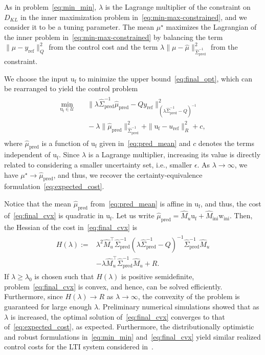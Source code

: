 \documentclass[letterpaper, 10 pt, conference]{ieeeconf}
\def\wir{\mathrm{w}_\mathrm{ini}}
\def\ufr{\mathrm{u}_\mathrm{f}}
\def\ur{u_\mathrm{ref}}
\def\yr{y_\mathrm{ref}}
\def\mph{\hat{\mu}_\mathrm{pred}}
\def\Sph{\hat{\Sigma}_\mathrm{pred}}
\begin{document}
As in problem~\eqref{eq:min_min}, $\lambda$ is the Lagrange multiplier of the constraint on $D_{KL}$ in the inner maximization problem in~\eqref{eq:min-max-constrained}, and we consider it to be a tuning parameter.
The mean $\mu^\star$ maximizes the Lagrangian of the inner problem in~\eqref{eq:min-max-constrained} by balancing the term $\|\mu-\yr\|_Q^2$ from the control cost and the term $\lambda\|\mu-\hat{\mu}\|_{\Sph^{-1}}^2$ from the constraint.

We choose the input $\ufr$ to minimize the upper bound~\eqref{eq:final_opt}, which can be rearranged to yield the control problem
\begin{align} \label{eq:final_cvx}
\begin{split}
    \min_{\ufr\in\mathcal{U}} & \quad \|\lambda\Sph^{-1}\mph - Q\yr\|_{(\lambda\Sph^{-1}-Q)^{-1}}^2 \\
    & \quad -\lambda\|\mph\|_{\Sph^{-1}}^2 + \|\ufr - \ur\|_{R}^2 + c,
\end{split}
\end{align}
where $\mph$ is a function of $\ufr$ given in~\eqref{eq:pred_mean} and $c$ denotes the terms independent of $\ufr$.
Since $\lambda$ is a Lagrange multiplier, increasing its value is directly related to considering a smaller uncertainty set, i.e., smaller $\epsilon$.
As $\lambda \to \infty$, we have $\mu^\star \to \mph$, and thus, we recover the certainty-equivalence formulation~\eqref{eq:expected_cost}.

Notice that the mean $\mph$ from~\eqref{eq:pred_mean} is affine in $\ufr$, and thus, the cost of~\eqref{eq:final_cvx} is quadratic in $\ufr$.
Let us write $\mph = \hat{M}_u \ufr + \hat{M}_\mathrm{ini}\wir$.
Then, the Hessian of the cost in~\eqref{eq:final_cvx} is
\begin{align*}
\begin{split}
    H(\lambda) := & \lambda^2\hat{M}_u^\top\Sph^{-1}\left(\lambda\Sph^{-1}-Q\right)^{-1}\Sph^{-1}\hat{M}_u \\
    & - \lambda\hat{M}_u^\top\Sph^{-1}\hat{M}_u + R.
\end{split}
\end{align*}
If $\lambda\geq\lambda_0$ is chosen such that $H(\lambda)$ is positive semidefinite, problem~\eqref{eq:final_cvx} is convex, and hence, can be solved efficiently.
Furthermore, since $H(\lambda) \to R$ as $\lambda\to\infty$, the convexity of the problem is guaranteed for large enough $\lambda$.
Preliminary numerical simulations showed that as $\lambda$ is increased, the optimal solution of~\eqref{eq:final_cvx} converges to that of~\eqref{eq:expected_cost}, as expected.
Furthermore, the distributionally optimistic and robust formulations in~\eqref{eq:min_min} and~\eqref{eq:final_cvx} yield similar realized control costs for the \gls{LTI} system considered in~\cite{dorfler2022bridging}.
\end{document}
